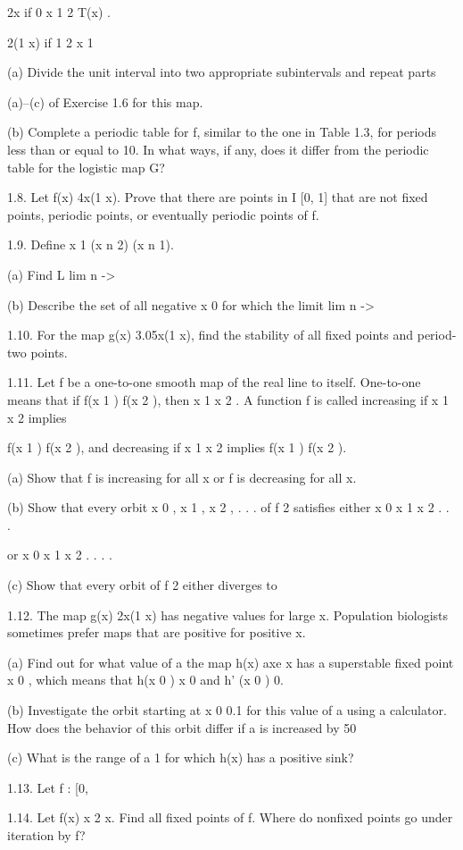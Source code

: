 \documentclass[12pt]{article}
\begin{document}
2x if 0 x 1  2 T(x)  . { 2(1  x) if 1  2 x 1

(a) Divide the unit interval into two appropriate subintervals and repeat parts

(a)–(c) of Exercise 1.6 for this map.

(b) Complete a periodic table for f, similar to the one in Table 1.3, for periods less than or equal to 10. 
In what ways, if any, does it differ from the periodic table for the logistic map G?

1.8. Let f(x)  4x(1  x). Prove that there are points in I  [0, 1] that are not fixed points, periodic 
points, or eventually periodic points of f.

1.9. Define x 1  (x n 2)  (x n 1).

(a) Find L  lim n ->   

(b) Describe the set of all negative x 0 for which the limit lim n -> 

1.10. For the map g(x)  3.05x(1  x), find the stability of all fixed points and period-two points.

1.11. Let f be a one-to-one smooth map of the real line to itself. One-to-one means that if f(x 1 )  f(x 2 
), then x 1  x 2 . A function f is called increasing if x 1  x 2 implies

f(x 1 )  f(x 2 ), and decreasing if x 1  x 2 implies f(x 1 ) 
 f(x 2 ).

(a) Show that f is increasing for all x or f is decreasing for all x.

(b) Show that every orbit x 0 , x 1 , x 2 , . . .  of f 2 satisfies either x 0 
 x 1 
 x 2 
 . . .

or x 0 x 1 x 2 . . . .

(c) Show that every orbit of f 2 either diverges to 

1.12. The map g(x)  2x(1  x) has negative values for large x. Population biologists sometimes prefer maps 
that are positive for positive x.

(a) Find out for what value of a the map h(x)  axe x has a superstable fixed point x 0 , which means that 
h(x 0 )  x 0 and h' (x 0 )  0.

(b) Investigate the orbit starting at x 0  0.1 for this value of a using a calculator. How does the 
behavior of this orbit differ if a is increased by 50%

(c) What is the range of a 
 1 for which h(x) has a positive sink?

1.13. Let f : [0, 

1.14. Let f(x)  x 2 x. Find all fixed points of f. Where do nonfixed points go under iteration by f?

}
\end{document}
